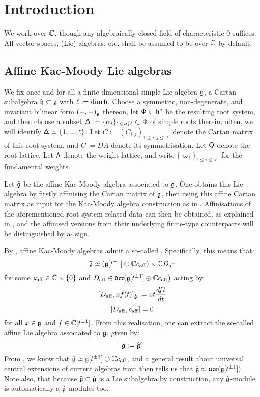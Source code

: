 \section{Introduction}
    \begin{convention}
        We work over $\mathbb{C}$, though any algebraically closed field of characteristic $0$ suffices. All vector spaces, (Lie) algebras, etc. shall be assumed to be over $\mathbb{C}$ by default.
    \end{convention}

    \subsection{Affine Kac-Moody Lie algebras}
        We fix once and for all a finite-dimensional simple Lie algebra $\mathfrak{g}$, a Cartan subalgebra $\mathfrak{h} \subset \mathfrak{g}$ with $\ell := \dim \mathfrak{h}$. Choose a symmetric, non-degenerate, and invariant bilinear form $(-, -)_{\mathfrak{g}}$ thereon, let $\mathsf{\Phi} \subset \mathfrak{h}^*$ be the resulting root system, and then choose a subset $\mathsf{\Delta} := \{\alpha_i\}_{1 \leqslant i \leqslant \ell} \subset \mathsf{\Phi}$ of simple roots therein; often, we will identify $\mathsf{\Delta} \simeq \{1, ..., \ell\}$. Let $C := (C_{i, j})_{1 \leq i, j \leq \ell}$ denote the Cartan matrix of this root system, and $C := DA$ denote its symmetrisation. Let $\mathsf{Q}$ denote the root lattice. Let $\mathsf{\Lambda}$ denote the weight lattice, and write $\{\varpi_i\}_{1 \leq i \leq \ell}$ for the fundamental weights.

        Let $\hat{\mathfrak{g}}$ be the affine Kac-Moody algebra associated to $\mathfrak{g}$. One obtains this Lie algebra by firstly affinising the Cartan matrix of $\mathfrak{g}$, then using this affine Cartan matrix as input for the Kac-Moody algebra construction as in \cite[Chapter 1]{kac_infinite_dimensional_lie_algebras}. Affinisations of the aforementioned root system-related data can then be obtained, as explained in \cite{kac_infinite_dimensional_lie_algebras}, and the affinised versions from their underlying finite-type counterparts will be distinguished by a $\hat{}$ sign.
        
        By \cite[Chapter 7]{kac_infinite_dimensional_lie_algebras}, affine Kac-Moody algebras admit a so-called . Specifically, this means that:
            $$\hat{\mathfrak{g}} \simeq (\mathfrak{g}[t^{\pm 1}] \oplus \mathbb{C} c_{\mathrm{aff}}) \rtimes \mathbb{C} D_{\mathrm{aff}}$$
        for some $c_{\mathrm{aff}} \in \mathbb{C} \smallsetminus \{0\}$ and $D_{\mathrm{aff}} \in \mathfrak{der}( \mathfrak{g}[t^{\pm 1}] \oplus \mathbb{C} c_{\mathrm{aff}} )$ acting by:
            $$[D_{\mathrm{aff}}, x f(t)]_{\hat{\mathfrak{g}}} := x t \frac{d ft}{dt}$$
            $$[D_{\mathrm{aff}}, c_{\mathrm{aff}}] = 0$$
        for all $x \in \mathfrak{g}$ and $f \in \mathbb{C}[t^{\pm 1}]$. From this realisation, one can extract the so-called affine Lie algebra associated to $\mathfrak{g}$, given by:
            $$\tilde{\mathfrak{g}} := \hat{\mathfrak{g}}'$$
        From \cite[Chapter 7]{kac_infinite_dimensional_lie_algebras}, we know that $\tilde{\mathfrak{g}} \simeq \mathfrak{g}[t^{\pm 1}] \oplus \mathbb{C} c_{\mathrm{aff}}$, and a general result about universal central extensions of current algebras from \cite{kassel_universal_central_extensions_of_lie_algebras} then tells us that $\tilde{\mathfrak{g}} \simeq \mathfrak{uce}(\mathfrak{g}[t^{\pm 1}])$. Note also, that because $\tilde{\mathfrak{g}} \subset \hat{\mathfrak{g}}$ is a Lie subalgebra by construction, any $\hat{\mathfrak{g}}$-module is automatically a $\tilde{\mathfrak{g}}$-modules too.

